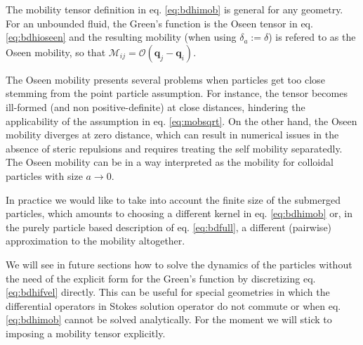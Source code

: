 \documentclass[ twoside,openright,titlepage,numbers=noenddot,%
headinclude,footinclude,cleardoublepage=empty,abstract=on,
BCOR=5mm,paper=a4,fontsize=11pt, dvipsnames
]{scrreprt}
\renewcommand{\vec}[1]{\bm{#1}}
\newcommand{\tens}[1]{\bm{\mathcal{#1}}}
\newcommand{\ppos}{q}
\begin{document}
The mobility tensor definition in eq. \eqref{eq:bdhimob} is general for any geometry. For an unbounded fluid, the Green's function is the Oseen tensor in eq. \eqref{eq:bdhioseen} and the resulting mobility (when using $\delta_a:=\delta$) is refered to as the Oseen mobility, so that $\tens{M}_{ij} = \tens{O}(\vec{\ppos}_j - \vec{\ppos}_i)$.

The Oseen mobility presents several problems when particles get too close stemming from the point particle assumption. For instance, the tensor becomes ill-formed (and non positive-definite) at close distances, hindering the applicability of the assumption in eq. \eqref{eq:mobsqrt}. On the other hand, the Oseen mobility diverges at zero distance, which can result in numerical issues in the absence of steric repulsions and requires treating the self mobility separatedly. The Oseen mobility can be in a way interpreted as the mobility for colloidal particles with size $a\rightarrow 0$.

In practice we would like to take into account the finite size of the submerged particles, which amounts to choosing a different kernel in eq. \eqref{eq:bdhimob} or, in the purely particle based description of eq. \eqref{eq:bdfull}, a different (pairwise) approximation to the mobility altogether.

We will see in future sections how to solve the dynamics of the particles without the need of the explicit form for the Green's function by discretizing eq. \eqref{eq:bdhifvel} directly. This can be useful for special geometries in which the differential operators in Stokes solution operator do not commute or when eq. \eqref{eq:bdhimob} cannot be solved analytically. For the moment we will stick to imposing a mobility tensor explicitly.
\end{document}
